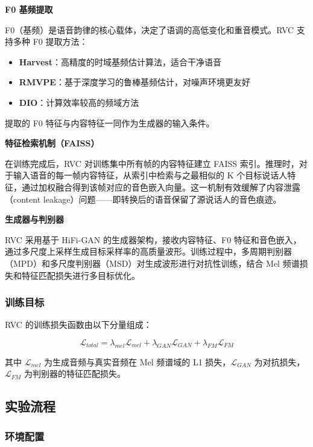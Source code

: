 \documentclass[
  english,
  letterpaper,
  DIV=11,
  numbers=noendperiod]{scrartcl}
\providecommand{\tightlist}{%
  \setlength{\itemsep}{0pt}\setlength{\parskip}{0pt}}
\begin{document}
\textbf{F0 基频提取}

F0（基频）是语音韵律的核心载体，决定了语调的高低变化和重音模式。RVC
支持多种 F0 提取方法：

\begin{itemize}
\tightlist
\item
  \textbf{Harvest}：高精度的时域基频估计算法，适合干净语音
\item
  \textbf{RMVPE}：基于深度学习的鲁棒基频估计，对噪声环境更友好
\item
  \textbf{DIO}：计算效率较高的频域方法
\end{itemize}

提取的 F0 特征与内容特征一同作为生成器的输入条件。

\textbf{特征检索机制（FAISS）}

在训练完成后，RVC 对训练集中所有帧的内容特征建立 FAISS
索引。推理时，对于输入语音的每一帧内容特征，从索引中检索与之最相似的 K
个目标说话人特征，通过加权融合得到该帧对应的音色嵌入向量。这一机制有效缓解了内容泄露（content
leakage）问题------即转换后的语音保留了源说话人的音色痕迹。

\textbf{生成器与判别器}

RVC 采用基于 HiFi-GAN 的生成器架构，接收内容特征、F0
特征和音色嵌入，通过多尺度上采样生成目标采样率的高质量波形。训练过程中，多周期判别器（MPD）和多尺度判别器（MSD）对生成波形进行对抗性训练，结合
Mel 频谱损失和特征匹配损失进行多目标优化。

\subsubsection{训练目标}\label{ux8badux7ec3ux76eeux6807}

RVC 的训练损失函数由以下分量组成：

\[\mathcal{L}_{total} = \lambda_{mel}\mathcal{L}_{mel} + \lambda_{GAN}\mathcal{L}_{GAN} + \lambda_{FM}\mathcal{L}_{FM}\]

其中 \(\mathcal{L}_{mel}\) 为生成音频与真实音频在 Mel 频谱域的 L1
损失，\(\mathcal{L}_{GAN}\) 为对抗损失，\(\mathcal{L}_{FM}\)
为判别器的特征匹配损失。

\subsection{实验流程}\label{ux5b9eux9a8cux6d41ux7a0b-1}

\subsubsection{环境配置}\label{ux73afux5883ux914dux7f6e}
\end{document}
